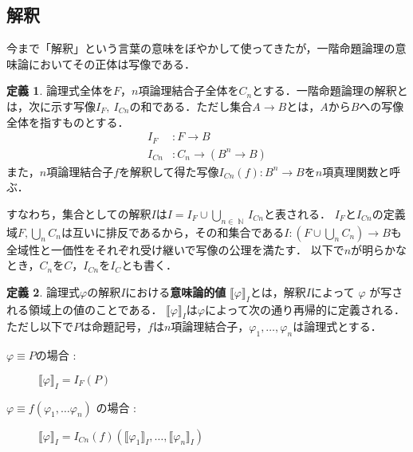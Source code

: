 \documentclass[uplatex,a4paper,dvipdfmx]{jsarticle}
\DeclareMathOperator{\Natural}{\mathbb{N}}
\newcommand{\semvalue}[1]{\llbracket {#1} \rrbracket}
\theoremstyle{definition}
\newtheorem{dfn}{定義}
\begin{document}
        \subsection{解釈}
            今まで「解釈」という言葉の意味をぼやかして使ってきたが，一階命題論理の意味論においてその正体は写像である．
            \begin{dfn}
                論理式全体を$F$，$n$項論理結合子全体を$C_n$とする．一階命題論理の解釈とは，次に示す写像$I_F,\ I_{Cn}$の和である．ただし集合$A \to B$とは，$A$から$B$への写像全体を指すものとする．%
                \begin{equation}
                \begin{aligned}
                    I_F&: F \to B \\
                    I_{Cn}&: C_n \to (B^n \to B)
                \end{aligned}
                \end{equation}
                また，$n$項論理結合子$f$を解釈して得た写像$I_{Cn}(f):B^n \to B$を$n$項真理関数と呼ぶ．
            \end{dfn}
            すなわち，集合としての解釈$I$は$\displaystyle I = I_F \cup \bigcup_{n \in \Natural} I_{Cn}$と表される．
            $I_F$と$I_{Cn}$の定義域$F, \bigcup_{n}C_n$は互いに排反であるから，その和集合である$I:(F \cup \bigcup_{n}C_n) \to B$も全域性と一価性をそれぞれ受け継いで写像の公理を満たす．%
            以下で$n$が明らかなとき，$C_n$を$C$，$I_{Cn}$を$I_C$とも書く．
            \begin{dfn}
                論理式$\varphi$の解釈$I$における\textbf{意味論的値} $\semvalue{\varphi}_I$とは，解釈$I$によって $\varphi$ が写される領域上の値のことである．
                $\semvalue{\varphi}_I$は$\varphi$によって次の通り再帰的に定義される．ただし以下で$P$は命題記号，$f$は$n$項論理結合子，$\varphi_1, \dots, \varphi_n$は論理式とする．
                \begin{description}
                    \item[$\varphi \equiv P$の場合 : ] $\semvalue{\varphi}_I = I_F(P)$
                    \item[$\varphi \equiv f(\varphi_1, \dots \varphi_n)$ の場合 : ] $\semvalue{\varphi}_I = I_{Cn}(f) (\semvalue{\varphi_1}_I, \dots, \semvalue{\varphi_n}_I)$
                \end{description}
            \end{dfn}
\end{document}

